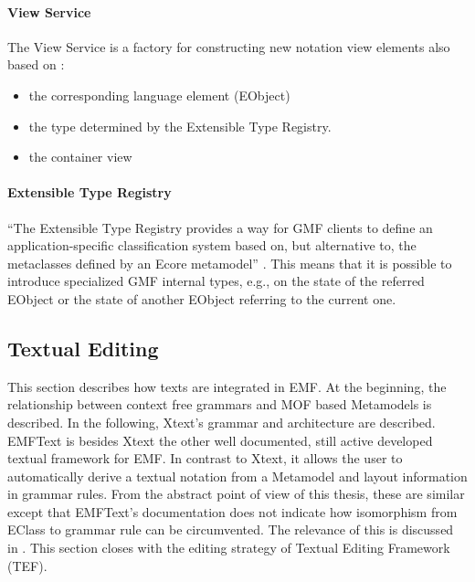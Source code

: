 \paragraph{View Service}
The View Service is a factory for constructing new notation view elements also based on \cite{GMFDoc}:
\begin{itemize}
	\item the corresponding language element (EObject)
	\item the type determined by the Extensible Type Registry.
	\item the container view  
\end{itemize}

\paragraph{Extensible Type Registry}
``The Extensible Type Registry provides a way for GMF clients to define an application-specific classification system based on, but alternative to, the metaclasses defined by an Ecore metamodel'' \cite{GMFDoc}. This means that it is possible to introduce specialized GMF internal types, e.g., on the state of the referred EObject or the state of another EObject referring to the current one.










 

\subsection{Textual Editing}
This section describes how texts are integrated in EMF. At the beginning, the relationship between context free grammars and MOF based Metamodels is described. In the following, Xtext's \cite{XTextMan} grammar and architecture are described. EMFText \cite{EMFTextMan} is besides Xtext the other well documented, still active developed textual framework for EMF. In contrast to Xtext, it allows the user to automatically derive a textual notation from a Metamodel and layout information in grammar rules. From the abstract point of view of this thesis, these are similar except that EMFText's documentation does not indicate how isomorphism from EClass to grammar rule can be circumvented. The relevance of this is discussed in . This section closes with the editing strategy of Textual Editing Framework (TEF).


